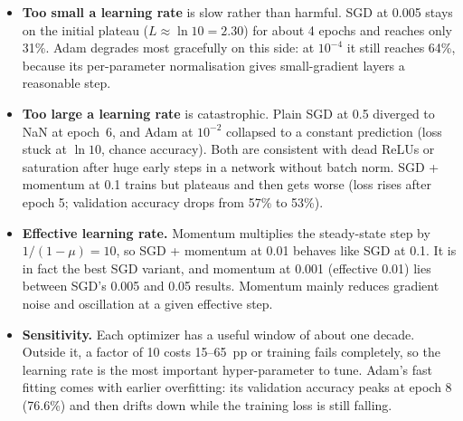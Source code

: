 \documentclass[10pt,a4paper]{article}
\begin{document}
\begin{itemize}
\item \textbf{Too small a learning rate} is slow rather than harmful. SGD at 0.005 stays on the initial plateau
($L\approx\ln 10=2.30$) for about 4 epochs and reaches only 31\%. Adam degrades most gracefully on this side: at $10^{-4}$ it still
reaches 64\%, because its per-parameter normalisation gives small-gradient layers a reasonable step.
\item \textbf{Too large a learning rate} is catastrophic. Plain SGD at 0.5 diverged to NaN at epoch~6, and Adam at $10^{-2}$
collapsed to a constant prediction (loss stuck at $\ln 10$, chance accuracy). Both are consistent with dead ReLUs or saturation after
huge early steps in a network without batch norm. SGD + momentum at 0.1 trains but plateaus and then gets worse (loss rises after
epoch 5; validation accuracy drops from 57\% to 53\%).
\item \textbf{Effective learning rate.} Momentum multiplies the steady-state step by $1/(1-\mu)=10$, so SGD + momentum at 0.01
behaves like SGD at 0.1. It is in fact the best SGD variant, and momentum at 0.001 (effective 0.01) lies between SGD's 0.005 and 0.05
results. Momentum mainly reduces gradient noise and oscillation at a given effective step.
\item \textbf{Sensitivity.} Each optimizer has a useful window of about one decade. Outside it, a factor of 10 costs 15--65~pp or
training fails completely, so the learning rate is the most important hyper-parameter to tune. Adam's fast fitting comes with
earlier overfitting: its validation accuracy peaks at epoch 8 (76.6\%) and then drifts down while the training loss is still falling.
\end{itemize}

\end{document}
